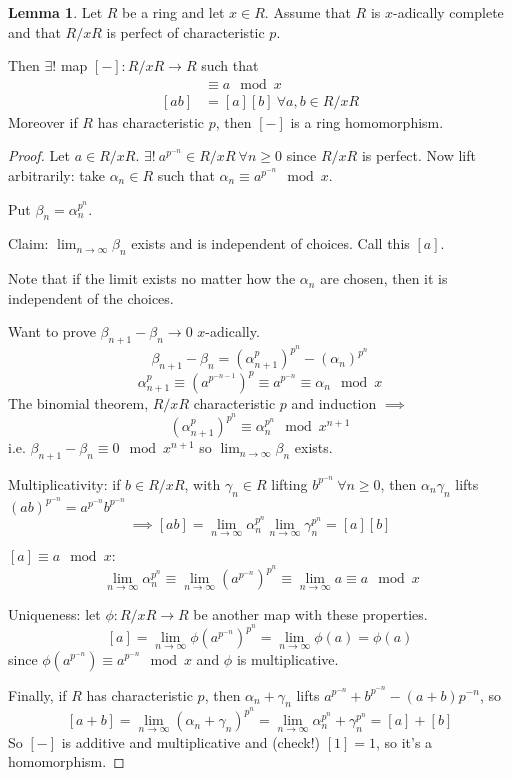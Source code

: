 \documentclass[a4paper]{article}
\theoremstyle{definition}
\theoremstyle{default}
\newtheorem{lemma}[definition]{Lemma}
\theoremstyle{remark}
\begin{document}
\begin{lemma}
	Let $R$ be a ring and let $x \in R$.
	Assume that $R$ is $x$-adically complete and that $R/xR$ is perfect of characteristic $p$.
	
	Then $\exists!$ map $[-]: R/xR \to R$ such that
	\begin{align*}
		[a] &\equiv a \mod x \\
		[ab] &= [a][b]\ \forall a,b \in R/xR
	\end{align*}
	Moreover if $R$ has characteristic $p$, then $[-]$ is a ring homomorphism.
\end{lemma}
\begin{proof}
	Let $a \in R/xR$.
	$\exists!\ a^{p^{-n}} \in R/xR\ \forall n \geq 0$ since $R/xR$ is perfect.
	Now lift arbitrarily: take $\alpha_n \in R$ such that $\alpha_n \equiv a^{p^{-n}} \mod x$.
	
	Put $\beta_n = \alpha_n^{p^n}$.
	
	Claim: $\lim_{n \to \infty} \beta_n$ exists and is independent of choices. Call this $[a]$.
	
	Note that if the limit exists no matter how the $\alpha_n$ are chosen,
	then it is independent of the choices.
	
	Want to prove $\beta_{n+1} - \beta_n \to 0$ $x$-adically.
	$$\beta_{n+1} - \beta_n = (\alpha_{n+1}^p)^{p^n}-(\alpha_{n})^{p^n}$$
	$$\alpha_{n+1}^p \equiv (a^{p^{-n-1}})^p \equiv a^{p^{-n}} \equiv \alpha_n \mod x$$
	The binomial theorem, $R/xR$ characteristic $p$ and induction $\implies$
	$$(\alpha_{n+1}^p)^{p^n} \equiv \alpha_n^{p^n} \mod x^{n+1}$$
	i.e. $\beta_{n+1} - \beta_n \equiv 0 \mod x^{n+1}$ so $\lim_{n \to \infty} \beta_n$ exists.
	
	Multiplicativity: if $b \in R/xR$, 
	with $\gamma_n \in R$ lifting $b^{p^{-n}}\ \forall n \geq 0$,
	then $\alpha_n\gamma_n$ lifts $(ab)^{p^{-n}} = a^{p^{-n}}b^{p^{-n}}$
	$$\implies [ab] = \lim_{n\to\infty}\alpha_n^{p^n}\lim_{n\to\infty}\gamma_n^{p^n}=[a][b]$$
	
	$[a]\equiv a \mod x:$
	$$\ \lim_{n\to\infty}\alpha_n^{p^n}\equiv\lim_{n\to\infty}(a^{p^{-n}})^{p^n}\equiv \lim_{n\to\infty} a \equiv a \mod x$$
	
	Uniqueness: let $\phi: R/xR \to R$ be another map with these properties.
	$$[a] = \lim_{n \to \infty} \phi(a^{p^{-n}})^{p^n} = \lim_{n\to\infty}\phi(a) = \phi(a)$$
	since $\phi(a^{p^{-n}}) \equiv a^{p^{-n}} \mod x$ and $\phi$ is multiplicative.
	
	Finally, if $R$ has characteristic $p$,
	then $\alpha_n+\gamma_n$ lifts $a^{p^{-n}}+b^{p^{-n}}-(a+b)p^{-n}$, so
	$$[a+b] = \lim_{n\to\infty}(\alpha_n+\gamma_n)^{p^n} = \lim_{n\to\infty}\alpha_n^{p^n}+\gamma_n^{p^n} = [a] + [b]$$
	So $[-]$ is additive and multiplicative and (check!) $[1]=1$, so it's a homomorphism.
\end{proof}
\end{document}
